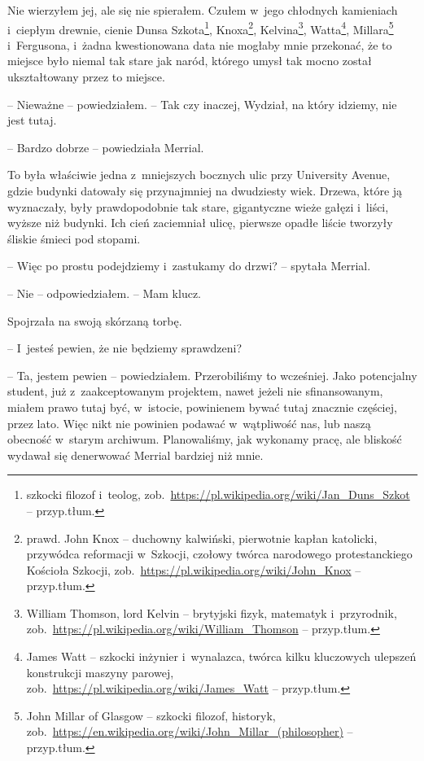\documentclass[oneside,polish,11pt,sfheadings]{mwbk}
\begin{document}
Nie wierzyłem jej, ale się nie spierałem. Czułem w~jego chłodnych
kamieniach i~ciepłym drewnie, cienie Dunsa Szkota\footnote{szkocki filozof i~teolog,
zob.~\url{https://pl.wikipedia.org/wiki/Jan\_Duns\_Szkot} -- przyp.tłum.}, Knoxa\footnote{ prawd. John Knox -- duchowny kalwiński,
pierwotnie kapłan katolicki, przywódca reformacji w~Szkocji, czołowy
twórca narodowego protestanckiego Kościoła Szkocji,
zob.~\url{https://pl.wikipedia.org/wiki/John\_Knox} -- przyp.tłum.}, Kelvina\footnote{ William Thomson, lord Kelvin -- brytyjski fizyk, matematyk i~przyrodnik,
zob.~\url{https://pl.wikipedia.org/wiki/William\_Thomson} -- przyp.tłum.}, Watta\footnote{James Watt -- szkocki inżynier i~wynalazca, twórca
kilku kluczowych ulepszeń konstrukcji maszyny parowej,
zob.~\url{https://pl.wikipedia.org/wiki/James\_Watt} -- przyp.tłum.}, Millara\footnote{ John Millar of Glasgow -- szkocki filozof,
historyk,
zob.~\url{https://en.wikipedia.org/wiki/John\_Millar\_(philosopher)}
-- przyp.tłum.} i~Fergusona, i~żadna kwestionowana data nie mogłaby mnie
przekonać, że to miejsce było niemal tak stare jak naród, którego umysł
tak mocno został ukształtowany przez to miejsce.

-- Nieważne -- powiedziałem. -- Tak czy inaczej, Wydział, na który idziemy,
nie jest tutaj.

-- Bardzo dobrze -- powiedziała Merrial.

To była właściwie jedna z~mniejszych bocznych ulic przy University
Avenue, gdzie budynki datowały się przynajmniej na dwudziesty wiek.
Drzewa, które ją wyznaczały, były prawdopodobnie tak stare, gigantyczne
wieże gałęzi i~liści, wyższe niż budynki. Ich cień zaciemniał ulicę,
pierwsze opadłe liście tworzyły śliskie śmieci pod stopami.

-- Więc po prostu podejdziemy i~zastukamy do drzwi? -- spytała Merrial.

-- Nie -- odpowiedziałem. -- Mam klucz.

Spojrzała na swoją skórzaną torbę. 

-- I~jesteś pewien, że nie będziemy
sprawdzeni?

-- Ta, jestem pewien -- powiedziałem. Przerobiliśmy to wcześniej. Jako
potencjalny student, już z~zaakceptowanym projektem, nawet jeżeli nie
sfinansowanym, miałem prawo tutaj być, w~istocie, powinienem bywać tutaj
znacznie częściej, przez lato. Więc nikt nie powinien podawać w~wątpliwość nas, lub naszą obecność w~starym archiwum. Planowaliśmy, jak
wykonamy pracę, ale bliskość wydawał się denerwować Merrial bardziej niż
mnie.
\end{document}
